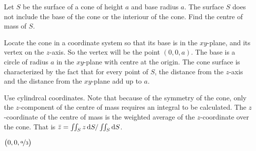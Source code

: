 \begin{question}[M317 2008D] %
Let $S$ be the surface of a cone of height $a$ and base radius $a$. 
The surface $S$ does not include the base of the cone or the interiour 
of the cone. Find the centre of mass of $S$.

Locate the cone in a coordinate system so that its base is in the 
$xy$-plane, and its vertex on the $z$-axis. So the vertex will 
be the point $(0, 0, a)$. The base is a circle of radius $a$ in the 
$xy$-plane with centre at the origin. The cone surface is characterized
by the fact that for every point of $S$, the distance from the $z$-axis 
and the distance from the $xy$-plane add up to $a$.

\end{question}

\begin{hint} 
Use cylindrcal coordinates. Note that because of the symmetry of the cone, 
only the $z$-component of the centre of mass requires an integral 
to be calculated. The $z$-coordinate of the centre of mass is 
the weighted average of the $z$-coordinate over the cone. That is
$\bar z =\iint_S z\,\mathrm{d}S/\iint_S\mathrm{d}S$.
\end{hint}

\begin{answer} 
$\big(0,0,\nicefrac{a}{3}\big)$
\end{answer}


